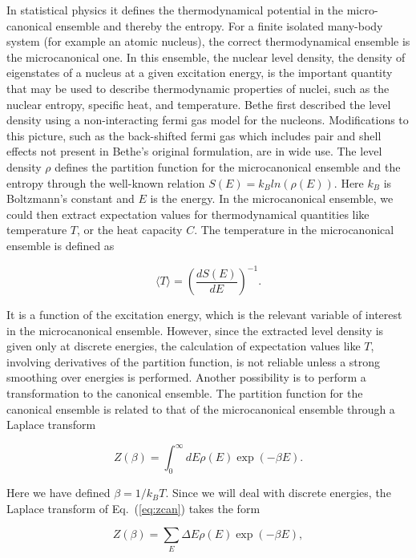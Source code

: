 \documentclass[%
oneside,                 %
final,                   %
10pt]{article}
\begin{document}
In statistical physics it defines the thermodynamical potential in the
micro-canonical ensemble and thereby the entropy.  For a finite
isolated many-body system (for example an atomic nucleus), the correct
thermodynamical ensemble is the microcanonical one. In this ensemble,
the nuclear level density, the density of eigenstates of a nucleus at
a given excitation energy, is the important quantity that may be used
to describe thermodynamic properties of nuclei, such as the nuclear
entropy, specific heat, and temperature.  Bethe first described the
level density using a non-interacting fermi gas model for the
nucleons.  Modifications to this picture, such as the back-shifted
fermi gas which includes pair and shell effects not present in Bethe's
original formulation, are in wide use.  The level density $\rho$
defines the partition function for the microcanonical ensemble and the
entropy through the well-known relation $S(E)=k_Bln(\rho(E))$.  Here
$k_B$ is Boltzmann's constant and $E$ is the energy.  In the
microcanonical ensemble, we could then extract expectation values for
thermodynamical quantities like temperature $T$, or the heat capacity
$C$. The temperature in the microcanonical ensemble is defined as

\begin{equation}
      \langle T\rangle=\left(\frac{dS(E)}{dE}\right)^{-1}.
      \label{eq:temp}
\end{equation}

It is a function of the excitation energy, which is the relevant
variable of interest in the microcanonical ensemble.  However, since
the extracted level density is given only at discrete energies, the
calculation of expectation values like $T$, involving derivatives of
the partition function, is not reliable unless a strong smoothing over
energies is performed. Another possibility is to perform a
transformation to the canonical ensemble.  The partition function for
the canonical ensemble is related to that of the microcanonical
ensemble through a Laplace transform

\begin{equation}
     Z(\beta)=\int_0^{\infty}dE\rho(E)\exp{(-\beta E)}.
     \label{eq:zcan}
\end{equation}

Here we have defined $\beta=1/k_BT$.  Since we will deal with discrete
energies, the Laplace transform of Eq.\ (\ref{eq:zcan}) takes the form

\begin{equation}
         Z(\beta)=\sum_E \Delta E\rho(E)\exp{(-\beta E)},
         \label{eq:zactual}
\end{equation}
\end{document}
